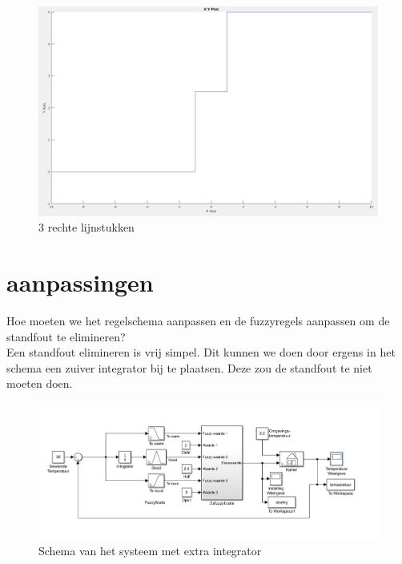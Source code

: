 \documentclass[a4paper, 12pt]{article}
\begin{document}
\newpage

\begin{table}[!h]
\centering
{}
\end{table}

\begin{figure}[!h]
	\includegraphics[width=1\linewidth]{Labo4_1_rechte.jpg}
	\caption{3 rechte lijnstukken}
\end{figure}

\newpage

\section{aanpassingen}

Hoe moeten we het regelschema aanpassen en de fuzzyregels aanpassen om de standfout te elimineren? \\

Een standfout elimineren is vrij simpel. Dit kunnen we doen door ergens in het schema een zuiver integrator bij te plaatsen. Deze zou de standfout te niet moeten doen.

\begin{figure}[!h]
	\includegraphics[width=1\linewidth]{Labo4_1_system_no_error.jpg}
	\caption{Schema van het systeem met extra integrator}
\end{figure}
\end{document}
